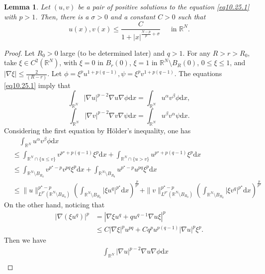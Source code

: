 \documentclass[12pt]{amsart}
\newtheorem{lem}[thm]{Lemma}
\theoremstyle{definition}
\theoremstyle{remark}
\theoremstyle{conclusion}
\theoremstyle{conjecture}
\numberwithin{equation}{section}
\newcommand{\R}{\mathbb{R}}
\begin{document}
\begin{lem}\label{lm.5}
Let $(u, v)$ be a pair of positive solutions to the equation \eqref{eq10.25.1} with $p>1$. Then, there is a $\sigma>0$ and a constant $C>0$ such that
$$ u(x) , v(x) \leq\frac{C}{1+|x|^{\frac{N-p}{p}+\sigma}} \quad \,\,\, \mbox{in}\,\, \R^N.$$
\end{lem}
\begin{proof}
Let $R_0>0$ large (to be determined later) and $q>1$. For any $R>r>R_0$, take $\xi\in C^2(\R^N)$, with $\xi=0$ in $B_r(0)$, $\xi=1$ in $\mathbb{R}^{N}\setminus B_R(0)$, $0 \leq \xi\leq 1$, and $|\nabla \xi| \leq \frac{2}{(R-r)}$. Let $\phi=\xi^p u^{1+p(q-1)}, \psi=\xi^p v^{1+p(q-1)}$. The equations \eqref{eq10.25.1} imply that
$$\int_{\R^N} |\nabla u|^{p-2} \nabla u \nabla\phi \mathrm{d}x=\int_{\R^N} u^{\alpha}v^{\beta} \phi \mathrm{d}x,$$
$$\int_{\R^N} |\nabla v|^{p-2} \nabla v \nabla\psi \mathrm{d}x=\int_{\R^N} u^{\beta}v^{\alpha} \psi \mathrm{d}x.$$
Considering the first equation by H\"{o}lder's inequality, one has
\begin{align}\label{eq10.26.1}
&\quad \int_{\R^N} u^{\alpha}v^{\beta} \phi \mathrm{d}x \\
           &\leq \int_{\R^N \cap \{u\leq v\}} v^{p^{\star}+p(q-1)} \xi^p\mathrm{d}x+\int_{\R^N \cap \{u> v\}} u^{p^{\star}+p(q-1)} \xi^p\mathrm{d}x \nonumber \\
           &\leq \int_{\R^N \setminus B_{R_0}} v^{p^{\star}-p}v^{pq}\xi^p \mathrm{d}x+\int_{\R^N \setminus B_{R_0}}u^{p^{\star}-p}u^{pq} \xi^p \mathrm{d}x \nonumber \\
           &\leq \|u\|_{L^{p^{\star}}(\R^N \setminus B_{R_0})}^{p^{\star}-p}\left(\int_{\R^N \setminus B_{R_0}} |\xi u^q|^{p^{\star}} \mathrm{d}x \right)^\frac{p}{p^{\star}}+\|v\|_{L^{p^{\star}}(\R^N \setminus B_{R_0})}^{p^{\star}-p}\left(\int_{\R^N \setminus B_{R_0}} |\xi v^q|^{p^{\star}} \mathrm{d}x \right)^\frac{p}{p^{\star}} \nonumber
\end{align}
On the other hand, noticing that
\begin{align*}
    |\nabla(\xi u^q)|^p &=|\nabla \xi u^q+ qu^{q-1}\nabla u\xi|^p\\
    &\leq C|\nabla \xi|^pu^{pq}+C q^p u^{p(q-1)}|\nabla u|^p \xi^p.
\end{align*}
Then we have
\begin{align}\label{eq10.26.2}
&\quad \int_{\R^N}|\nabla u|^{p-2} \nabla u \nabla\phi \mathrm{d}x\\

\end{align}
\end{proof}
\end{document}
